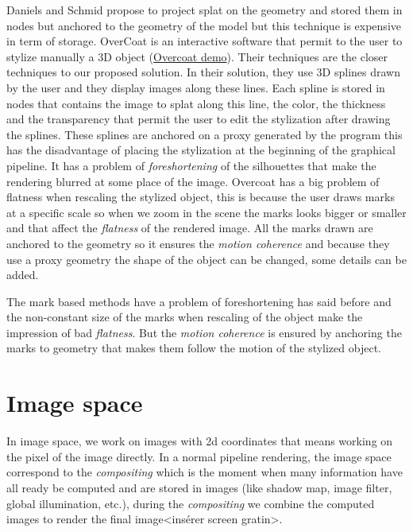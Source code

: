 Daniels\cite{Daniels_1999} and Schmid\cite{schmid_overcoat:_2011} propose to project splat on the geometry and stored them in nodes but anchored to the geometry of the model but this technique is expensive in term of storage. OverCoat\cite{schmid_overcoat:_2011} is an interactive software that permit to the user to stylize manually a 3D object (\href{https://www.youtube.com/watch?v=Nfw6JxC9Fw4}{Overcoat demo}). Their techniques are the closer techniques to our proposed solution. In their solution, they use 3D splines drawn by the user and they display images along these lines. Each spline is stored in nodes that contains the image to splat along this line, the color, the thickness and the transparency that permit the user to edit the stylization after drawing the splines. These splines are anchored on a proxy generated by the program this has the disadvantage of placing the stylization at the beginning of the graphical pipeline. It has a problem of \textit{foreshortening} of the silhouettes that make the rendering blurred at some place of the image. Overcoat has a big problem of flatness when rescaling the stylized object, this is because the user draws marks at a specific scale so when we zoom in the scene the marks looks bigger or smaller and that affect the \textit{flatness} of the rendered image. All the marks drawn are anchored to the geometry so it ensures the \textit{motion coherence} and because they use a proxy geometry the shape of the object can be changed, some details can be added.

The mark based methods have a problem of foreshortening has said before and the non-constant size of the marks when rescaling of the object make the impression of bad \textit{flatness}. But the \textit{motion coherence} is ensured by anchoring the marks to geometry that makes them follow the motion of the stylized object.




\section{Image space}

In image space, we work on images with 2d coordinates that means working on the pixel of the image directly. In a normal pipeline rendering, the image space correspond to the \textit{compositing} which is the moment when many information have all ready be computed and are stored in images (like shadow map, image filter, global illumination, etc.), during the \textit{compositing} we combine the computed images to render the final image<insérer screen gratin>. \newline

